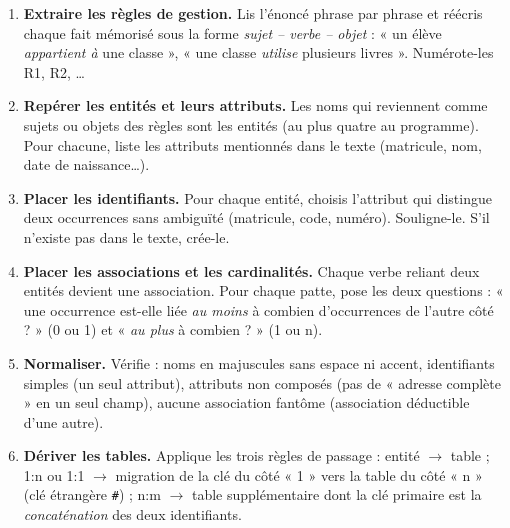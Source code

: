 \documentclass[11pt]{article}
\begin{document}
\begin{methode}
\begin{enumerate}
  \item \textbf{Extraire les règles de gestion.} Lis l'énoncé phrase par phrase et réécris chaque fait mémorisé sous la forme \emph{sujet -- verbe -- objet} : « un élève \emph{appartient à} une classe », « une classe \emph{utilise} plusieurs livres ». Numérote-les R1, R2, \dots
  \item \textbf{Repérer les entités et leurs attributs.} Les noms qui reviennent comme sujets ou objets des règles sont les entités (au plus quatre au programme). Pour chacune, liste les attributs mentionnés dans le texte (matricule, nom, date de naissance\dots).
  \item \textbf{Placer les identifiants.} Pour chaque entité, choisis l'attribut qui distingue deux occurrences sans ambiguïté (matricule, code, numéro). Souligne-le. S'il n'existe pas dans le texte, crée-le.
  \item \textbf{Placer les associations et les cardinalités.} Chaque verbe reliant deux entités devient une association. Pour chaque patte, pose les deux questions : « une occurrence est-elle liée \emph{au moins} à combien d'occurrences de l'autre côté ? » (0 ou 1) et « \emph{au plus} à combien ? » (1 ou n).
  \item \textbf{Normaliser.} Vérifie : noms en majuscules sans espace ni accent, identifiants simples (un seul attribut), attributs non composés (pas de « adresse complète » en un seul champ), aucune association fantôme (association déductible d'une autre).
  \item \textbf{Dériver les tables.} Applique les trois règles de passage : entité $\rightarrow$ table ; 1:n ou 1:1 $\rightarrow$ migration de la clé du côté « 1 » vers la table du côté « n » (clé étrangère \texttt{\#}) ; n:m $\rightarrow$ table supplémentaire dont la clé primaire est la \emph{concaténation} des deux identifiants.
\end{enumerate}
\end{methode}
\end{document}
